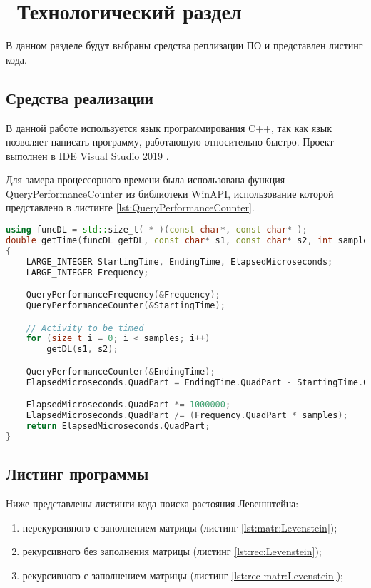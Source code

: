 \chapter{ Технологический раздел}
\label{cha:technological}

    В данном разделе будут выбраны средства реплизации ПО и представлен листинг кода. 

    \section{Средства реализации}
        В данной работе используется язык программирования C++, так как
        язык позволяет написать программу, работающую относительно быстро. 
        Проект выполнен в IDE Visual Studio 2019 \cite{visual-studio}.

        Для замера процессорного времени была использована функция QueryPerformanceCounter \cite{QueryPerformanceCounter} 
        из библиотеки WinAPI, использование которой представлено в листинге \ref{lst:QueryPerformanceCounter}.

        \begin{lstlisting}[language=C++, label=lst:QueryPerformanceCounter, caption=Функция замера времени]
using funcDL = std::size_t( * )(const char*, const char* );
double getTime(funcDL getDL, const char* s1, const char* s2, int samples)
{
    LARGE_INTEGER StartingTime, EndingTime, ElapsedMicroseconds;
    LARGE_INTEGER Frequency;

    QueryPerformanceFrequency(&Frequency);
    QueryPerformanceCounter(&StartingTime);

    // Activity to be timed
    for (size_t i = 0; i < samples; i++)
        getDL(s1, s2);

    QueryPerformanceCounter(&EndingTime);
    ElapsedMicroseconds.QuadPart = EndingTime.QuadPart - StartingTime.QuadPart;

    ElapsedMicroseconds.QuadPart *= 1000000;
    ElapsedMicroseconds.QuadPart /= (Frequency.QuadPart * samples);
    return ElapsedMicroseconds.QuadPart;
}
        \end{lstlisting}

    \section{Листинг программы}
        Ниже представлены листинги кода поиска растояния Левенштейна: \begin{enumerate}
            \item нерекурсивного с заполнением матрицы (листинг \ref{lst:matr:Levenstein});
            \item рекурсивного без заполнения матрицы (листинг \ref{lst:rec:Levenstein});
            \item рекурсивного с заполнением матрицы (листинг \ref{lst:rec-matr:Levenstein});
        \end{enumerate}
        
